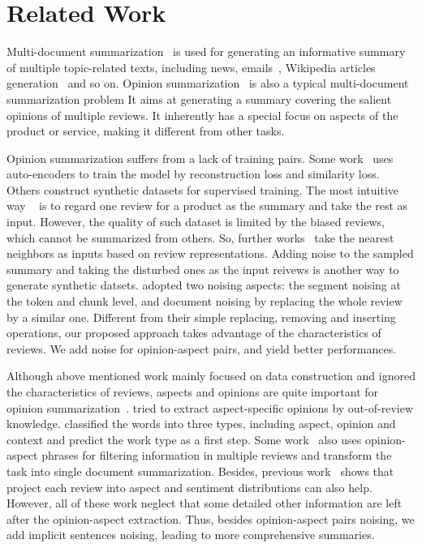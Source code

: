 \section{Related Work}
\label{sec:related}

Multi-document summarization~\cite{abs-2011-04843} is used for generating an informative summary of multiple topic-related texts, including 
news\cite{FabbriLSLR19}, emails~\cite{ZajicDL08}, Wikipedia articles generation~\cite{LiuSPGSKS18} and so on. Opinion summarization~\cite{GeraniMCNN14} is also a typical multi-document summarization problem
It aims at generating 
a summary covering the salient opinions %
of multiple reviews. It inherently has a special focus on aspects of the product or service, making it different from other tasks.

Opinion summarization suffers from a lack of training pairs. 
Some work~\cite{MeanSum19} uses auto-encoders to train the model 
by reconstruction loss and similarity loss. 
Others construct synthetic datasets for supervised training. 
The most intuitive way 
~\cite{Copycat20, Fewshot20} is to 
regard one review for a product as the summary 
and take the rest as input. 
However, the quality of such dataset is limited by the biased reviews, 
which cannot be summarized from others. 
So, further works~\cite{Plansum20} take the nearest neighbors as inputs based on review representations.
Adding noise to the sampled summary and taking the disturbed ones as the input reivews is another way to generate synthetic datsets. \citet{Denoise20} adopted two noising aspects: the segment noising at the token and chunk level, and document noising by replacing the whole review by a similar one. 
Different from their simple replacing, removing and inserting operations, 
our proposed approach takes advantage of the characteristics of reviews. 
We add noise for opinion-aspect pairs, and yield better performances.

Although above mentioned work mainly focused on data construction and ignored the characteristics of reviews, aspects and opinions are quite important for opinion summarization~\cite{MukherjeePVGBG20}.  \citet{AngelidisL18} tried to extract aspect-specific opinions by out-of-review knowledge. 
\citet{TianY019} classified the words into three types, including aspect, opinion and context and predict the work type as a first step. Some work~\cite{OpiDig20} also uses opinion-aspect phrases for filtering information in multiple reviews and transform the task into single document summarization. Besides, previous work~\cite{Plansum20} shows that project each review into aspect and sentiment distributions can also help. However, all of these work neglect that some detailed other information are left after the opinion-aspect extraction. Thus, besides opinion-aspect pairs noising, we add implicit sentences noising, leading to more comprehensive summaries.  
